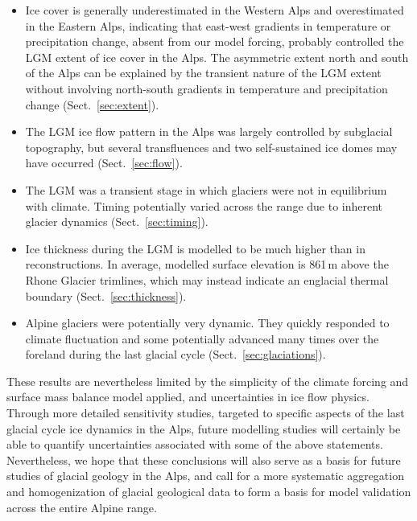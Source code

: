 \documentclass[tc, manuscript]{copernicus}
\begin{document}
    \begin{itemize}
      \item Ice cover is generally underestimated in the Western Alps and
            overestimated in the Eastern Alps, indicating that east-west
            gradients in temperature or precipitation change, absent from our
            model forcing, probably controlled the LGM extent of ice cover in
            the Alps. The asymmetric extent north and south of the Alps
            can be explained by the transient nature of the LGM extent without
            involving north-south gradients in temperature and precipitation
            change (Sect.~\ref{sec:extent}).
      \item The LGM ice flow pattern in the Alps was largely controlled by
            subglacial topography, but several transfluences and two
            self-sustained ice domes may have occurred (Sect.~\ref{sec:flow}).
      \item The LGM was a transient stage in which glaciers were not in
            equilibrium with climate. Timing potentially varied across the
            range due to inherent glacier dynamics (Sect.~\ref{sec:timing}).
      \item Ice thickness during the LGM is modelled to be much higher than in
            reconstructions. In average, modelled surface elevation is 861\,m
            above the Rhone Glacier trimlines, which may instead indicate an
            englacial thermal boundary (Sect.~\ref{sec:thickness}).
      \item Alpine glaciers were potentially very dynamic. They quickly
            responded to climate fluctuation and some potentially advanced many
            times over the foreland during the last glacial cycle
            (Sect.~\ref{sec:glaciations}).
    \end{itemize}

    These results are nevertheless limited by the simplicity of the climate
    forcing and surface mass balance model applied, and uncertainties in ice
    flow physics. Through more detailed sensitivity studies, targeted to
    specific aspects of the last glacial cycle ice dynamics in the Alps, future
    modelling studies will certainly be able to quantify uncertainties
    associated with some of the above statements. Nevertheless, we hope that
    these conclusions will also serve as a basis for future studies of glacial
    geology in the Alps, and call for a more systematic aggregation and
    homogenization of glacial geological data to form a basis for model
    validation across the entire Alpine range.
\end{document}
